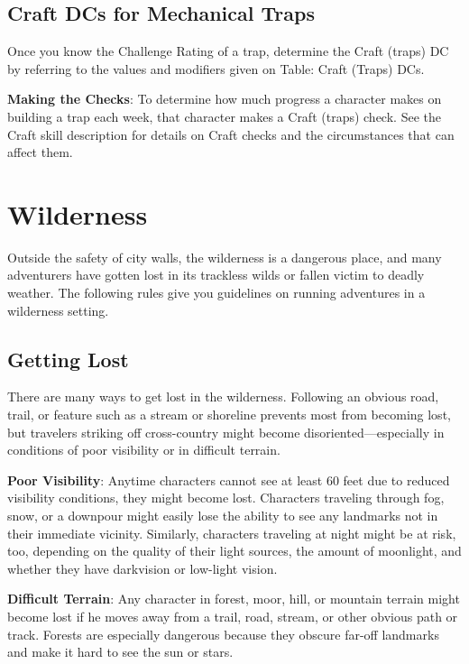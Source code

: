 \subsection{Craft DCs for Mechanical Traps}

				
Once you know the Challenge Rating of a trap, determine the Craft (traps) DC by referring to the values and modifiers given on Table: Craft (Traps) DCs.
				
\textbf{Making the Checks}: To determine how much progress a character makes on building a trap each week, that character makes a Craft (traps) check. See the Craft skill description for details on Craft checks and the circumstances that can affect them.
				
\section{Wilderness}

				
Outside the safety of city walls, the wilderness is a dangerous place, and many adventurers have gotten lost in its trackless wilds or fallen victim to deadly weather. The following rules give you guidelines on running adventures in a wilderness setting.
				
\subsection{Getting Lost}

				
There are many ways to get lost in the wilderness. Following an obvious road, trail, or feature such as a stream or shoreline prevents most from becoming lost, but travelers striking off cross-country might become disoriented---especially in conditions of poor visibility or in difficult terrain. 
				
\textbf{Poor Visibility}: Anytime characters cannot see at least 60 feet due to reduced visibility conditions, they might become lost. Characters traveling through fog, snow, or a downpour might easily lose the ability to see any landmarks not in their immediate vicinity. Similarly, characters traveling at night might be at risk, too, depending on the quality of their light sources, the amount of moonlight, and whether they have darkvision or low-light vision.
				
\textbf{Difficult Terrain}: Any character in forest, moor, hill, or mountain terrain might become lost if he moves away from a trail, road, stream, or other obvious path or track. Forests are especially dangerous because they obscure far-off landmarks and make it hard to see the sun or stars.
				
